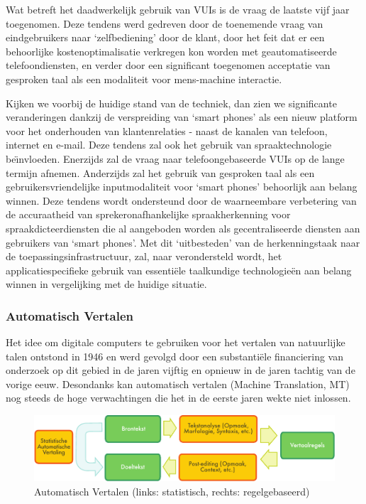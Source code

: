 \documentclass[]{../../metanetpaper}
\begin{document}
\begin{multicols}{2}
    Wat betreft het daadwerkelijk gebruik van VUIs is de vraag de laatste vijf jaar toegenomen. Deze tendens werd gedreven door de toenemende vraag van eindgebruikers naar `zelfbediening' door de klant, door het feit dat er een behoorlijke kostenoptimalisatie verkregen kon worden met geautomatiseerde telefoondiensten, en verder door een significant toegenomen acceptatie van gesproken taal als een modaliteit voor mens-machine interactie.

    Kijken we voorbij de huidige stand van de techniek, dan zien we significante veranderingen dankzij de verspreiding van `smart phones' als een nieuw platform voor het onderhouden van klantenrelaties - naast de kanalen van telefoon, internet en e-mail. Deze tendens zal ook het gebruik van spraaktechnologie be{\"\i}nvloeden. Enerzijds zal de vraag naar telefoongebaseerde VUIs op de lange termijn afnemen. Anderzijds zal het gebruik van gesproken taal als een gebruikersvriendelijke inputmodaliteit voor `smart phones' behoorlijk aan belang winnen. Deze tendens wordt ondersteund door de waarneembare verbetering van de accuraatheid van sprekeronafhankelijke spraakherkenning voor spraakdicteerdiensten die al aangeboden worden als gecentraliseerde diensten aan gebruikers van `smart phones'. Met dit `uitbesteden' van de herkenningstaak naar de toepassingsinfrastructuur, zal, naar verondersteld wordt, het applicatiespecifieke gebruik van essenti{\"e}le taalkundige technologie{\"e}n aan belang winnen in vergelijking met de huidige situatie.

\subsubsection{Automatisch Vertalen}

  Het idee om digitale computers te gebruiken voor het vertalen van natuurlijke talen ontstond in 1946  en werd gevolgd door een substanti{\"e}le financiering van onderzoek op dit gebied in de jaren vijftig en opnieuw in de jaren tachtig van de vorige eeuw. Desondanks kan automatisch vertalen (Machine Translation, MT) nog steeds de hoge verwachtingen die het in de eerste jaren wekte niet inlossen.

\begin{figure}[htb]
  \center
  \includegraphics[width=\textwidth]{../_media/dutch/machine_translation}
  \vspace{-2mm}
  \caption{Automatisch Vertalen (links: statistisch, rechts: regelgebaseerd)}
  \label{fig:mtarch_de}
\end{figure}


\end{multicols}
\end{document}
